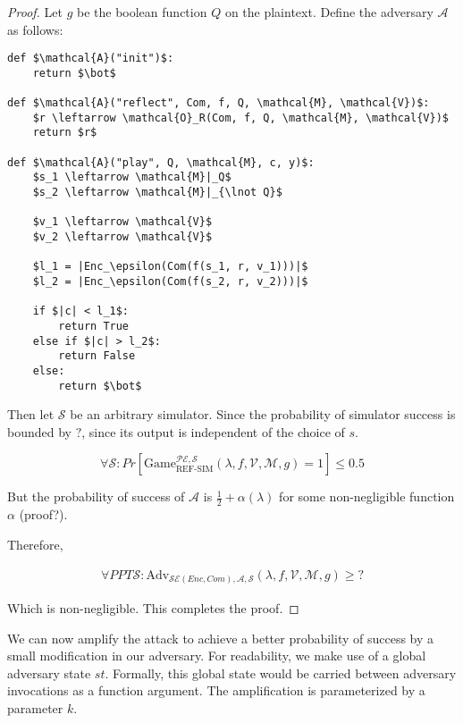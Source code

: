 \documentclass{article}
\begin{document}
\begin{proof}

Let $g$ be the boolean function $Q$ on the plaintext. Define the adversary
$\mathcal{A}$ as follows:

\begin{lstlisting}[texcl,mathescape]
def $\mathcal{A}("init")$:
    return $\bot$

def $\mathcal{A}("reflect", Com, f, Q, \mathcal{M}, \mathcal{V})$:
    $r \leftarrow \mathcal{O}_R(Com, f, Q, \mathcal{M}, \mathcal{V})$
    return $r$

def $\mathcal{A}("play", Q, \mathcal{M}, c, y)$:
    $s_1 \leftarrow \mathcal{M}|_Q$
    $s_2 \leftarrow \mathcal{M}|_{\lnot Q}$

    $v_1 \leftarrow \mathcal{V}$
    $v_2 \leftarrow \mathcal{V}$

    $l_1 = |Enc_\epsilon(Com(f(s_1, r, v_1)))|$
    $l_2 = |Enc_\epsilon(Com(f(s_2, r, v_2)))|$

    if $|c| < l_1$:
        return True
    else if $|c| > l_2$:
        return False
    else:
        return $\bot$
\end{lstlisting}

Then let $\mathcal{S}$ be an arbitrary simulator. Since the probability of simulator
success is bounded by $?$, since its output is independent of the choice of
$s$.

\begin{equation}
    \forall \mathcal{S}:
    Pr[\text{Game}_{\text{REF-SIM}}^{\mathcal{PE},\mathcal{S}}(\lambda, f, \mathcal{V}, \mathcal{M}, g) = 1] \leq 0.5
\end{equation}

But the probability of success of $\mathcal{A}$ is $\frac{1}{2} + \alpha(\lambda)$ for some non-negligible function $\alpha$ (proof?).

Therefore,

\begin{equation}
\begin{split}
    \forall PPT \mathcal{S}:
    \text{Adv}_{\mathcal{SE}(Enc, Com), \mathcal{A}, \mathcal{S}}(\lambda, f, \mathcal{V}, \mathcal{M}, g) \geq ?
\end{split}
\end{equation}

Which is non-negligible. This completes the proof.

\end{proof}

We can now amplify the attack to achieve a better probability of success by a small modification in our adversary. For readability, we make use of a global adversary state $st$. Formally, this global state would be carried between adversary invocations as a function argument. The amplification is parameterized by a parameter $k$.
\end{document}
